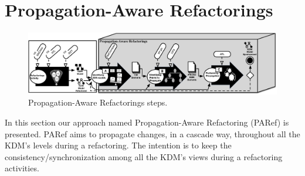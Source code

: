 %
\section{Propagation-Aware Refactorings} %
\label{sec:the_approach}

\begin{figure}[t]
	\centering
	\includegraphics[scale=0.545]{figuras/StepsApproach}
	\caption{Propagation-Aware Refactorings steps.}
	\label{fig:approach}
\end{figure}

In this section our approach named Propagation-Aware Refactoring (PARef) is presented. PARef aims to propagate changes, in a cascade way, throughout all the KDM's levels during a refactoring. The intention is to keep the consistency/synchronization among all the KDM's views during a refactoring activities.


